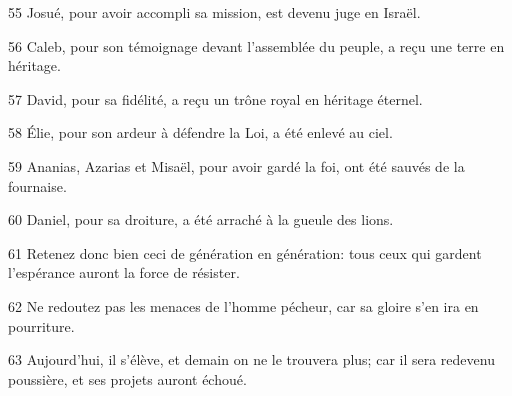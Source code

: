 
55 Josué, pour avoir accompli sa mission, est devenu juge en Israël.

56 Caleb, pour son témoignage devant l’assemblée du peuple, a reçu une terre en héritage.

57 David, pour sa fidélité, a reçu un trône royal en héritage éternel.

58 Élie, pour son ardeur à défendre la Loi, a été enlevé au ciel.

59 Ananias, Azarias et Misaël, pour avoir gardé la foi, ont été sauvés de la fournaise.

60 Daniel, pour sa droiture, a été arraché à la gueule des lions.

61 Retenez donc bien ceci de génération en génération: tous ceux qui gardent l’espérance auront la force de résister.

62 Ne redoutez pas les menaces de l’homme pécheur, car sa gloire s’en ira en pourriture.

63 Aujourd’hui, il s’élève, et demain on ne le trouvera plus; car il sera redevenu poussière, et ses projets auront échoué.
